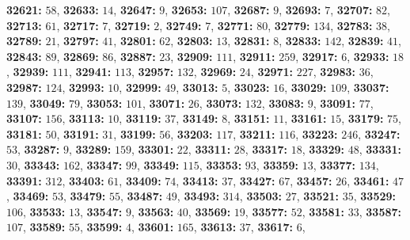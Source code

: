 \textsf{\bfseries 32621:} $58$, \textsf{\bfseries 32633:} $14$, \textsf{\bfseries 32647:} $9$, \textsf{\bfseries 32653:} $107$, \textsf{\bfseries 32687:} $9$, \textsf{\bfseries 32693:} $7$, \textsf{\bfseries 32707:} $82$, \textsf{\bfseries 32713:} $61$, \textsf{\bfseries 32717:} $7$, \textsf{\bfseries 32719:} $2$, \textsf{\bfseries 32749:} $7$, \textsf{\bfseries 32771:} $80$, \textsf{\bfseries 32779:} $134$, \textsf{\bfseries 32783:} $38$, \textsf{\bfseries 32789:} $21$, \textsf{\bfseries 32797:} $41$, \textsf{\bfseries 32801:} $62$, \textsf{\bfseries 32803:} $13$, \textsf{\bfseries 32831:} $8$, \textsf{\bfseries 32833:} $142$, \textsf{\bfseries 32839:} $41$, \textsf{\bfseries 32843:} $89$, \textsf{\bfseries 32869:} $86$, \textsf{\bfseries 32887:} $23$, \textsf{\bfseries 32909:} $111$, \textsf{\bfseries 32911:} $259$, \textsf{\bfseries 32917:} $6$, \textsf{\bfseries 32933:} $18$, \textsf{\bfseries 32939:} $111$, \textsf{\bfseries 32941:} $113$, \textsf{\bfseries 32957:} $132$, \textsf{\bfseries 32969:} $24$, \textsf{\bfseries 32971:} $227$, \textsf{\bfseries 32983:} $36$, \textsf{\bfseries 32987:} $124$, \textsf{\bfseries 32993:} $10$, \textsf{\bfseries 32999:} $49$, \textsf{\bfseries 33013:} $5$, \textsf{\bfseries 33023:} $16$, \textsf{\bfseries 33029:} $109$, \textsf{\bfseries 33037:} $139$, \textsf{\bfseries 33049:} $79$, \textsf{\bfseries 33053:} $101$, \textsf{\bfseries 33071:} $26$, \textsf{\bfseries 33073:} $132$, \textsf{\bfseries 33083:} $9$, \textsf{\bfseries 33091:} $77$, \textsf{\bfseries 33107:} $156$, \textsf{\bfseries 33113:} $10$, \textsf{\bfseries 33119:} $37$, \textsf{\bfseries 33149:} $8$, \textsf{\bfseries 33151:} $11$, \textsf{\bfseries 33161:} $15$, \textsf{\bfseries 33179:} $75$, \textsf{\bfseries 33181:} $50$, \textsf{\bfseries 33191:} $31$, \textsf{\bfseries 33199:} $56$, \textsf{\bfseries 33203:} $117$, \textsf{\bfseries 33211:} $116$, \textsf{\bfseries 33223:} $246$, \textsf{\bfseries 33247:} $53$, \textsf{\bfseries 33287:} $9$, \textsf{\bfseries 33289:} $159$, \textsf{\bfseries 33301:} $22$, \textsf{\bfseries 33311:} $28$, \textsf{\bfseries 33317:} $18$, \textsf{\bfseries 33329:} $48$, \textsf{\bfseries 33331:} $30$, \textsf{\bfseries 33343:} $162$, \textsf{\bfseries 33347:} $99$, \textsf{\bfseries 33349:} $115$, \textsf{\bfseries 33353:} $93$, \textsf{\bfseries 33359:} $13$, \textsf{\bfseries 33377:} $134$, \textsf{\bfseries 33391:} $312$, \textsf{\bfseries 33403:} $61$, \textsf{\bfseries 33409:} $74$, \textsf{\bfseries 33413:} $37$, \textsf{\bfseries 33427:} $67$, \textsf{\bfseries 33457:} $26$, \textsf{\bfseries 33461:} $47$, \textsf{\bfseries 33469:} $53$, \textsf{\bfseries 33479:} $55$, \textsf{\bfseries 33487:} $49$, \textsf{\bfseries 33493:} $314$, \textsf{\bfseries 33503:} $27$, \textsf{\bfseries 33521:} $35$, \textsf{\bfseries 33529:} $106$, \textsf{\bfseries 33533:} $13$, \textsf{\bfseries 33547:} $9$, \textsf{\bfseries 33563:} $40$, \textsf{\bfseries 33569:} $19$, \textsf{\bfseries 33577:} $52$, \textsf{\bfseries 33581:} $33$, \textsf{\bfseries 33587:} $107$, \textsf{\bfseries 33589:} $55$, \textsf{\bfseries 33599:} $4$, \textsf{\bfseries 33601:} $165$, \textsf{\bfseries 33613:} $37$, \textsf{\bfseries 33617:} $6$, 
